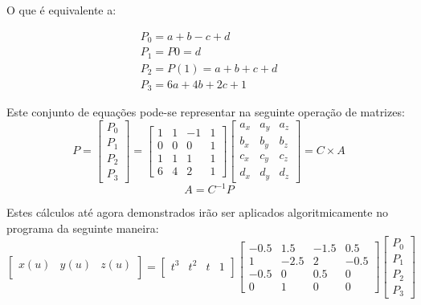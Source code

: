 O que é equivalente a:

\begin{gather*}
P_{0} = a+b-c+d 		\\
P_{1} = P{0} = d 		\\
P_{2}=P(1)=a+b+c+d 	\\
P_{3}=6a+4b+2c+1
\end{gather*}

Este conjunto de equações pode-se representar na seguinte operação de matrizes:
\begin{equation}	
P=\begin{bmatrix}
		       P_{0} \\
		       P_{1} \\
		       P_{2} \\
		       P_{3}
		     \end{bmatrix}
= \begin{bmatrix}
 1 & 1 & -1 & 1 \\
 0 & 0 & 0 & 1 \\
 1 & 1 & 1 & 1 \\
 6 & 4 & 2 & 1
\end{bmatrix}
\begin{bmatrix}
a_{x} & a_{y} & a_{z}    \\
b_{x} & b_{y} & b_{z}    \\
c_{x} & c_{y} & c_{z}    \\
d_{x} & d_{y} & d_{z} 
\end{bmatrix} = C \times A
\label{eq:catmullmatrix}
\end{equation}
\begin{equation}
A = C^{-1}P
\label{eq:catmullmatrixa}
\end{equation}

Estes cálculos até agora demonstrados irão ser aplicados algoritmicamente no programa da seguinte maneira:
\begin{equation}	
\begin{bmatrix}
       x(u) & y(u) & z(u)             \\
\end{bmatrix} = 
\begin{bmatrix}
       t^{3} & t^{2} & t & 1          \\
\end{bmatrix}
\begin{bmatrix}
-0.5 & 1.5 & -1.5 & 0.5 \\
1 & -2.5 & 2 & -0.5     \\
-0.5 & 0 & 0.5 & 0      \\
0 & 1 & 0 & 0
\end{bmatrix}
\begin{bmatrix}
P_{0} \\
P_{1} \\
P_{2} \\
P_{3}
\end{bmatrix}
\label{eq:formula}
\end{equation}




